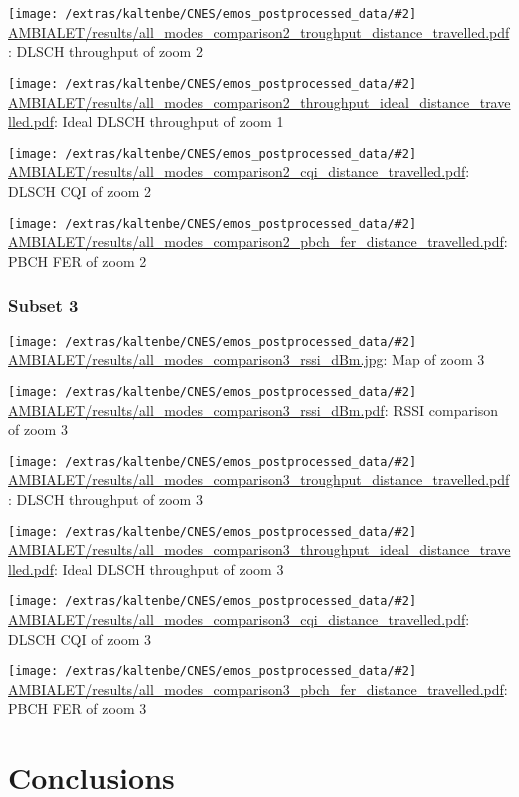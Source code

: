 \documentclass[a4paper,10pt]{article}
\newcommand{\printfile}[2][]{
 \begin{minipage}{8cm}
  \centering
  \texttt{[image: /extras/kaltenbe/CNES/emos\_postprocessed\_data/\#2]}
  \url{#2}: #1

 \end{minipage}
}
\begin{document}
\printfile[DLSCH throughput of zoom 2]{AMBIALET/results/all_modes_comparison2_troughput_distance_travelled.pdf}
\printfile[Ideal DLSCH throughput of zoom 1]{AMBIALET/results/all_modes_comparison2_throughput_ideal_distance_travelled.pdf}

\printfile[DLSCH CQI of zoom 2]{AMBIALET/results/all_modes_comparison2_cqi_distance_travelled.pdf}
\printfile[PBCH FER of zoom 2]{AMBIALET/results/all_modes_comparison2_pbch_fer_distance_travelled.pdf}

\subsubsection*{Subset 3}

\printfile[Map of zoom 3]{AMBIALET/results/all_modes_comparison3_rssi_dBm.jpg}
\printfile[RSSI comparison of zoom 3]{AMBIALET/results/all_modes_comparison3_rssi_dBm.pdf}

\printfile[DLSCH throughput of zoom 3]{AMBIALET/results/all_modes_comparison3_troughput_distance_travelled.pdf}
\printfile[Ideal DLSCH throughput of zoom 3]{AMBIALET/results/all_modes_comparison3_throughput_ideal_distance_travelled.pdf}

\printfile[DLSCH CQI of zoom 3]{AMBIALET/results/all_modes_comparison3_cqi_distance_travelled.pdf}
\printfile[PBCH FER of zoom 3]{AMBIALET/results/all_modes_comparison3_pbch_fer_distance_travelled.pdf}


\section{Conclusions}


 

\end{document}
